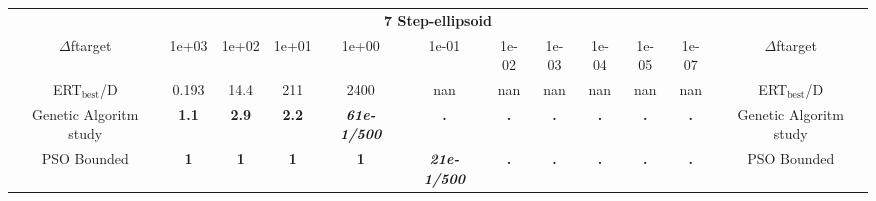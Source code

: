 \begin{tabular}{cccccccccccc}
 & \multicolumn{10}{c}{{\normalsize \textbf{7 Step-ellipsoid}}}\\
$\Delta$ftarget& 1e+03& 1e+02& 1e+01& 1e+00& 1e-01& 1e-02& 1e-03& 1e-04& 1e-05& 1e-07 & $\Delta$ftarget \\
ERT$_{\textrm{best}}$/D& 0.193& 14.4& 211& 2400& nan& nan& nan& nan& nan& nan & ERT$_{\textrm{best}}$/D \\
\hline
Genetic Algoritm study & \textbf{1.1} & \textbf{2.9} & \textbf{2.2} & \textbf{\textit{61e-1}\textit{/500}} & \textbf{.} & \textbf{.} & \textbf{.} & \textbf{.} & \textbf{.} & \textbf{.} & Genetic Algoritm study \cite{add_an_entry_for_Genetic Algoritm study_in_bbob.bib}\\
PSO Bounded & \textbf{1} & \textbf{1} & \textbf{1} & \textbf{1} & \textbf{\textit{21e-1}\textit{/500}} & \textbf{.} & \textbf{.} & \textbf{.} & \textbf{.} & \textbf{.} & PSO Bounded \cite{add_an_entry_for_PSO Bounded_in_bbob.bib}
\end{tabular}
